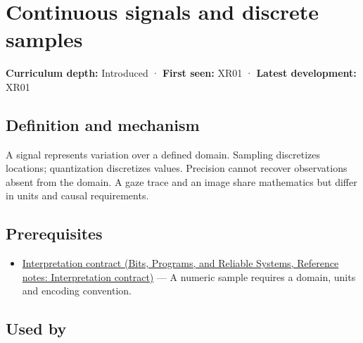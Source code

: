 \hypertarget{appendix-1077ea8fc737}{}\label{referencestart:appendix-1077ea8fc737}
\section{Continuous signals and discrete samples}\label{appendix-1077ea8fc737-continuous-signals-and-discrete-samples}

\hypertarget{appendix-1077ea8fc737-continuous-signals-and-discrete-samples}{}

\textbf{Curriculum depth:} Introduced · \textbf{First seen:} XR01 · \textbf{Latest development:} XR01

\begin{allmightroledefinition}

\subsection{Definition and mechanism}\label{appendix-1077ea8fc737-definition-and-mechanism}

\hypertarget{appendix-1077ea8fc737-definition-and-mechanism}{}

A signal represents variation over a defined domain. Sampling discretizes locations; quantization discretizes values. Precision cannot recover observations absent from the domain. A gaze trace and an image share mathematics but differ in units and causal requirements.

\end{allmightroledefinition}

\subsection{Prerequisites}\label{appendix-1077ea8fc737-prerequisites}

\hypertarget{appendix-1077ea8fc737-prerequisites}{}

\begin{itemize}
\tightlist
\item
  \href{../01-Bits-Programs-and-Reliable-Systems/main.pdf\#nameddest=appendix-f414bd4ed05c}{Interpretation contract (Bits, Programs, and Reliable Systems, Reference notes: Interpretation contract)} --- A numeric sample requires a domain, units and encoding convention.
\end{itemize}

\subsection{Used by}\label{appendix-1077ea8fc737-used-by}

